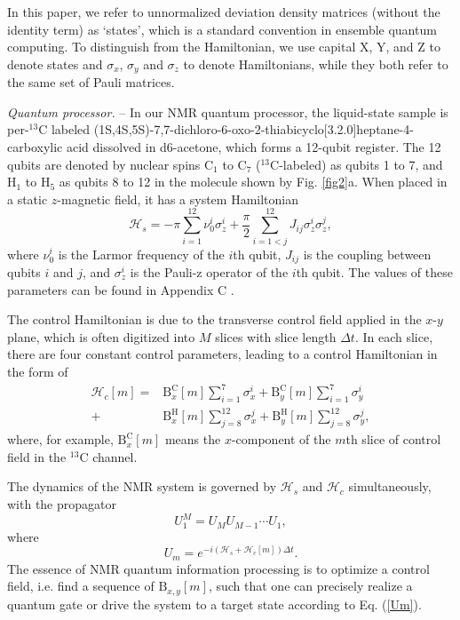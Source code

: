 \documentclass[twocolumn,reprint, amsmath,amssymb,showpacs,superscriptaddress]{revtex4-1}
\newcommand{\be}{\begin{equation}}
\newcommand{\ee}{\end{equation}}
\begin{document}
In this paper, we refer to unnormalized deviation density matrices (without the identity term)  as `states', which is a standard convention in ensemble quantum computing. To distinguish from the Hamiltonian, we use capital X, Y, and Z to denote states and $\sigma_x$, $\sigma_y$ and $\sigma_z$ to denote Hamiltonians, while they both refer to the same set of Pauli matrices.

\emph{Quantum processor.} -- In our NMR quantum processor, the liquid-state sample is per-$^{13}$C labeled (1S,4S,5S)-7,7-dichloro-6-oxo-2-thiabicyclo[3.2.0]heptane-4-carboxylic acid dissolved in d6-acetone, which forms a 12-qubit register. The 12 qubits are denoted by nuclear spins C$_1$ to C$_7$ ($^{13}$C-labeled) as qubits 1 to 7, and H$_1$ to H$_5$ as qubits 8 to 12 in the molecule shown by Fig. \ref{fig2}a. When placed in a static $z$-magnetic field, it has a system Hamiltonian
\be
\mathcal{H}_{s} =  -\pi\sum_{i=1}^{12} \nu_0^i \sigma_z^{i} + \frac{\pi}{2}\sum_{i=1<j}^{12} J_{ij} \sigma_z^{i}\sigma_z^{j},
\label{Hnmr}
\ee
where $\nu_0^i$ is the Larmor frequency of the $i$th qubit, $J_{ij}$ is the coupling between qubits $i$ and $j$, and $\sigma_z^i$ is the Pauli-z operator of the $i$th qubit. The values of these parameters can be found in Appendix C \cite{supple}.

The control Hamiltonian is due to the transverse control field applied in the $x$-$y$ plane, which is often digitized into $M$ slices with slice length $\Delta t$. In each slice, there are four constant control parameters, leading to a control Hamiltonian in the form of
\begin{align}
\mathcal{H}_{c}[m]  = {} & \text{B}_x^\text{C}[m]\sum_{i=1}^7 \sigma_x^i + \text{B}_y^\text{C}[m]\sum_{i=1}^7 \sigma_y^i  \\ \nonumber
+{}  &  \text{B}_x^\text{H}[m]\sum_{j=8}^{12} \sigma_x^j + \text{B}_y^\text{H}[m]\sum_{j=8}^{12} \sigma_y^j,
\label{Hext}
\end{align}
where, for example, $\text{B}_x^\text{C}[m]$ means the $x$-component of the $m$th slice of control field     in the $^{13}$C channel.

The dynamics of the NMR system is governed by $\mathcal{H}_{s}$ and $\mathcal{H}_{c}$ simultaneously, with the propagator
\be
U_{1}^{M} = U_MU_{M-1}\cdots U_{1},
\label{Um}
\ee
where
\be
U_m = e^{-i(\mathcal{H}_{s}+\mathcal{H}_{c}[m])\Delta t}.
\ee
The essence of NMR quantum information processing is to optimize a control field, i.e. find a sequence of $\text{B}_{x,y}[m]$, such that one can precisely realize a quantum gate or drive the system to a target state according to Eq. (\ref{Um}).
\end{document}
